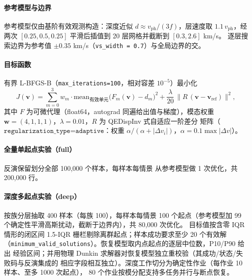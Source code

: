 \documentclass[UTF8,a4paper,11pt]{ctexart}
\begin{document}
\paragraph{参考模型与边界} 参考模型仅由基阶有效观测构造：深度近似
\(d \approx v_{\text{ph}}/(3f)\)，层速度取 \(1.1\,v_{\text{ph}}\)，经两次
\([0.25,0.5,0.25]\) 平滑后插值到 20 层网格并截断到 \([0.3,2.6]\) km/s。
逐层搜索边界为参考值 \(\pm 0.35\) km/s（\texttt{vs\_width = 0.7}）与全局边界的交。

\paragraph{目标函数} 有界 L-BFGS-B（\texttt{max\_iterations=100}，相对容差
\(10^{-5}\)）最小化
\begin{equation}
J(\mathbf{v}) = \sum_{m=0}^{3} w_m \cdot \mathrm{mean}_{\text{有效单元}}
\big(F_m(\mathbf{v}) - d_m\big)^2
+ \frac{\lambda}{20}\,\big\| R\,(\mathbf{v}-\mathbf{v}_{\text{ref}})\big\|^2 ,
\end{equation}
其中 \(F\) 为可微代理（float64，autograd 同遍给出值与梯度），模态权重
\(\mathbf{w}=(4,1,1,1)\)，\(\lambda=0.01\)，\(R\) 为 QEDispInv 式自适应一阶差分
矩阵（\(\texttt{regularization\_type=adaptive}\)：权重
\(\alpha/(\alpha+|\Delta v_i|)\)，\(\alpha=0.1\max|\Delta v|\)）。

\paragraph{全量单起点实验（full）} 反演保留划分全部 100{,}000 个样本，每样本每情景
从参考模型做 1 次优化，共 200{,}000 行。

\paragraph{深度多起点实验（deep）} 按族分层抽取 400 样本（每族 100），每样本每情景
100 个起点（参考模型加 99 个确定性平滑高斯扰动，截断于边界内），共 80{,}000 次优化。
目标值按含零 IQR 情形的闭区间 1.5-IQR 栅栏剔除离群起点；样本成功要求至少 20 个有效解
（\texttt{minimum\_valid\_solutions}）。恢复模型取内点起点的逐层中位数，P10/P90 给出
经验区间；并用物理 Dunkin 求解器对恢复模型独立重校验（其成功/状态/失败码与反演集成的
相应字段相互独立）。深度工作切分为确定性作业（每作业 10 样本、至多 1000 次起点），
80 个作业按模分配支持多任务并行与断点恢复。
\end{document}
